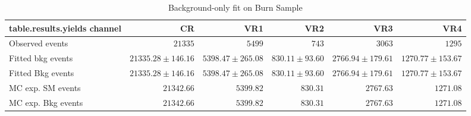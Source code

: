 

\begin{table}
\centering
\small
\begin{tabular*}{\textwidth}{@{\extracolsep{\fill}}lrrrrr}
\toprule
\textbf{table.results.yields channel}           & CR            & VR1            & VR2            & VR3            & VR4              \\
\midrule
Observed events          & $21335$              & $5499$              & $743$              & $3063$              & $1295$                    \\
\midrule
Fitted bkg events         & $21335.28 \pm 146.16$          & $5398.47 \pm 265.08$          & $830.11 \pm 93.60$          & $2766.94 \pm 179.61$          & $1270.77 \pm 153.67$              \\
\midrule
        Fitted Bkg events         & $21335.28 \pm 146.16$          & $5398.47 \pm 265.08$          & $830.11 \pm 93.60$          & $2766.94 \pm 179.61$          & $1270.77 \pm 153.67$              \\
 \midrule
MC exp. SM events              & $21342.66$          & $5399.82$          & $830.31$          & $2767.63$          & $1271.08$              \\
\midrule
        MC exp. Bkg events         & $21342.66$          & $5399.82$          & $830.31$          & $2767.63$          & $1271.08$              \\
\bottomrule
\end{tabular*}
\caption{Background-only fit on Burn Sample}
\label{}
\end{table}
%